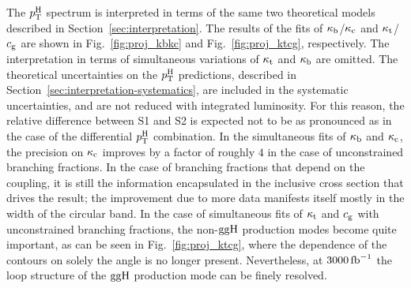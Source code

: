 The $p_\mathrm{T}^\mathrm{H}$ spectrum is interpreted in terms of the same two theoretical models described in Section~\ref{sec:interpretation}.
% 
The results of the fits of $\kappa_{\mathrm{b}}$/$\kappa_{\mathrm{c}}$ and $\kappa_{\mathrm{t}}$/$c_\mathrm{g}$ are shown in Fig.~\ref{fig:proj_kbkc} and Fig.~\ref{fig:proj_ktcg}, respectively.
% 
The interpretation in terms of simultaneous variations of $\kappa_{\mathrm{t}}$ and $\kappa_{\mathrm{b}}$ are omitted.
% 
The theoretical uncertainties on the $p_\mathrm{T}^\mathrm{H}$ predictions, described in Section~\ref{sec:interpretation-systematics}, are included in the systematic uncertainties, and are not reduced with integrated luminosity.
% 
For this reason, the relative difference between S1 and S2 is expected not to be as pronounced as in the case of the differential $p_\mathrm{T}^\mathrm{H}$ combination.
% 
In the simultaneous fits of $\kappa_{\mathrm{b}}$ and $\kappa_{\mathrm{c}}$, the precision on $\kappa_{\mathrm{c}}$ improves by a factor of roughly $4$ in the case of unconstrained branching fractions.
% 
In the case of branching fractions that depend on the coupling, it is still the information encapsulated in the inclusive cross section that drives the result; the improvement due to more data manifests itself mostly in the width of the circular band.
% 
In the case of simultaneous fits of $\kappa_{\mathrm{t}}$ and $c_\mathrm{g}$ with unconstrained branching fractions, the non-$\mathrm{g}\mathrm{g}\mathrm{H}$ production modes become quite important, as can be seen in Fig.~\ref{fig:proj_ktcg}, where the dependence of the contours on solely the angle is no longer present.
% 
Nevertheless, at $3000\,\text{fb}^{-1}$ the loop structure of the $\mathrm{g}\mathrm{g}\mathrm{H}$ production mode can be finely resolved.



